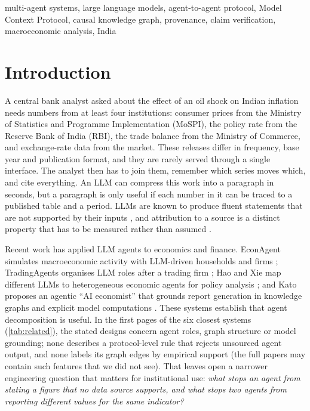 \documentclass[conference]{IEEEtran}
\begin{document}
\begin{IEEEkeywords}
multi-agent systems, large language models, agent-to-agent protocol, Model Context Protocol, causal knowledge graph, provenance, claim verification, macroeconomic analysis, India
\end{IEEEkeywords}

\section{Introduction}
\label{sec:intro}

A central bank analyst asked about the effect of an oil shock on Indian inflation needs numbers from at least four institutions: consumer prices from the Ministry of Statistics and Programme Implementation (MoSPI), the policy rate from the Reserve Bank of India (RBI), the trade balance from the Ministry of Commerce, and exchange-rate data from the market. These releases differ in frequency, base year and publication format, and they are rarely served through a single interface. The analyst then has to join them, remember which series moves which, and cite everything. An LLM can compress this work into a paragraph in seconds, but a paragraph is only useful if each number in it can be traced to a published table and a period. LLMs are known to produce fluent statements that are not supported by their inputs \cite{ji2023hallucination}, and attribution to a source is a distinct property that has to be measured rather than assumed \cite{rashkin2023ais,gao2023alce}.

Recent work has applied LLM agents to economics and finance. EconAgent simulates macroeconomic activity with LLM-driven households and firms \cite{li2024econagent}; TradingAgents organises LLM roles after a trading firm \cite{xiao2024tradingagents}; Hao and Xie map different LLMs to heterogeneous economic agents for policy analysis \cite{hao2025mlab}; and Kato proposes an agentic ``AI economist'' that grounds report generation in knowledge graphs and explicit model computations \cite{kato2026aieconomist}. These systems establish that agent decomposition is useful. In the first pages of the six closest systems (\cref{tab:related}), the stated designs concern agent roles, graph structure or model grounding; none describes a protocol-level rule that rejects unsourced agent output, and none labels its graph edges by empirical support (the full papers may contain such features that we did not see). That leaves open a narrower engineering question that matters for institutional use: \emph{what stops an agent from stating a figure that no data source supports, and what stops two agents from reporting different values for the same indicator?}
\end{document}
